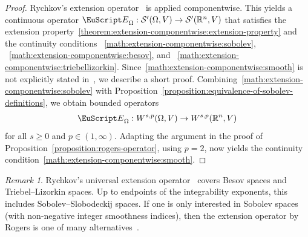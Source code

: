 \documentclass[10pt,a4paper]{amsart}
\theoremstyle{definition}
\theoremstyle{remark}
\newtheorem{remark}[theorem]{Remark}
\numberwithin{equation}{section}
\newcommand{\bbR}{{\mathbb R}}
\newcommand{\calS}{{\mathcal S}}
\newcommand{\euE}{{\EuScript E}}
\newcommand{\Domain}{{\Omega}}
\newcommand{\Extension}{\euE}
\newcommand{\Wint}{W}
\newcommand{\VEC}{{V}}
\begin{document}
\begin{proof}
    Rychkov's extension operator~\cite{rychkov1999restrictions} is applied componentwise. 
    This yields a continuous operator $\Extension_{\Domain} : \calS'(\Domain,\VEC) \to \calS'(\bbR^{n},\VEC)$
    that satisfies the extension property~\eqref{theorem:extension-componentwise:extension-property}
    and the continuity conditions 
   ~\eqref{math:extension-componentwise:sobolev},
   ~\eqref{math:extension-componentwise:besov}, and
   ~\eqref{math:extension-componentwise:triebellizorkin}.
Since~\eqref{math:extension-componentwise:smooth} is not explicitly stated in~\cite{rychkov1999restrictions}, we describe a short proof.
    Combining~\eqref{math:extension-componentwise:sobolev} with Proposition~\ref{proposition:equivalence-of-sobolev-definitions}, we obtain bounded operators
    \begin{align*}
        \Extension_{\Domain} : \Wint^{s,p}(\Domain,\VEC) \to \Wint^{s,p}(\bbR^{n},\VEC)
    \end{align*}
    for all $s \geq 0$ and $p \in (1,\infty)$.
    Adapting the argument in the proof of Proposition~\ref{proposition:rogers-operator}, using $p=2$, now yields the continuity condition~\eqref{math:extension-componentwise:smooth}.
\end{proof}

\begin{remark}
    Rychkov's universal extension operator~\cite{rychkov1999restrictions} covers Besov spaces and Triebel--Lizorkin spaces. 
    Up to endpoints of the integrability exponents, this includes Sobolev--Slobodeckij spaces. 
    If one is only interested in Sobolev spaces (with non-negative integer smoothness indices), 
    then the extension operator by Rogers is one of many alternatives~\cite{rogers2006degree}. 
\end{remark}




    
    
    
\end{document}
